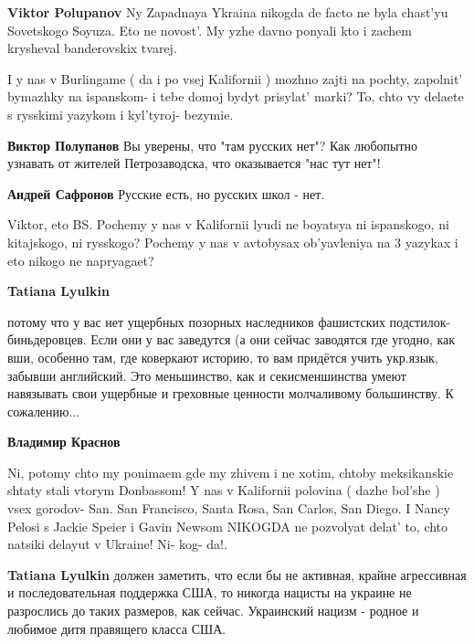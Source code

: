 \begin{itemize}
\begin{itemize} %
\textbf{Viktor Polupanov} Ny Zapadnaya Ykraina nikogda de facto ne byla chast'yu Sovetskogo Soyuza. Eto ne novost'. My yzhe davno ponyali kto i zachem krysheval banderovskix tvarej.


I y nas v Burlingame ( da i po vsej Kalifornii ) mozhno zajti na pochty,
zapolnit' bymazhky na ispanskom- i tebe domoj bydyt prisylat' marki? To, chto
vy delaete s rysskimi yazykom i kyl'tyroj- bezymie.


\textbf{Виктор Полупанов} Вы уверены, что "там русских нет"? Как любопытно узнавать от жителей Петрозаводска, что оказывается "нас тут нет"!

\textbf{Андрей Сафронов} Русские есть, но русских школ - нет.
\end{itemize} %


Viktor, eto BS. Pochemy y nas v Kalifornii lyudi ne boyatsya ni ispanskogo, ni
kitajskogo, ni rysskogo? Pochemy y nas v avtobysax ob'yavleniya na 3 yazykax i
eto nikogo ne napryagaet?

\begin{itemize} %
\textbf{Tatiana Lyulkin} 

потому что у вас нет ущербных позорных наследников фашистских
подстилок-биньдеровцев. Если они у вас заведутся (а они сейчас заводятся где
угодно, как вши, особенно там, где коверкают историю, то вам придётся учить
укр.язык, забывши английский. Это меньшинство, как и секисменшинства умеют
навязывать свои ущербные и греховные ценности молчаливому большинству. К
сожалению...


\textbf{Владимир Краснов} 

Ni, potomy chto my ponimaem gde my zhivem i ne xotim, chtoby meksikanskie
shtaty stali vtorym Donbassom! Y nas v Kalifornii polovina ( dazhe bol'she )
vsex gorodov- San. San Francisco, Santa Rosa, San Carlos, San Diego. I Nancy
Pelosi s Jackie Speier i Gavin Newsom NIKOGDA ne pozvolyat delat' to, chto
natsiki delayut v Ukraine! Ni- kog- da!.

\textbf{Tatiana Lyulkin} должен заметить, что если бы не активная, крайне агрессивная и последовательная поддержка США, то никогда нацисты на украине не разрослись до таких размеров, как сейчас. Украинский нацизм - родное и любимое дитя правящего класса США.


\end{itemize}
\end{itemize}
